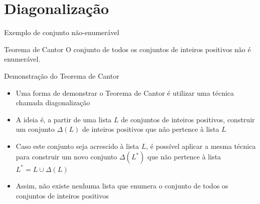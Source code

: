 \section{Diagonalização}

\begin{frame}[fragile]{Exemplo de conjunto não-enumerável}

    \begin{block}{Teorema de Cantor}
        O conjunto de todos os conjuntos de inteiros positivos não é enumerável.
    \end{block}

\end{frame}

\begin{frame}[fragile]{Demonstração do Teorema de Cantor}

    \begin{itemize}
        \item Uma forma de demonstrar o Teorema de Cantor é utilizar uma técnica chamada
            diagonalização

        \item A ideia é, a partir de uma lista $L$ de conjuntos de inteiros positivos,
            construir um conjunto $\Delta(L)$ de inteiros positivos que não pertence à lista
            $L$

        \item Caso este conjunto seja acrescido à lista $L$, é possível aplicar a mesma
            técnica para construir um novo conjunto $\Delta(L^*)$ que não pertence à
            lista $L^* = L\cup \Delta(L)$

        \item Assim, não existe nenhuma lista que enumera o conjunto de todos os conjuntos de
            inteiros positivos
    \end{itemize}

\end{frame}

